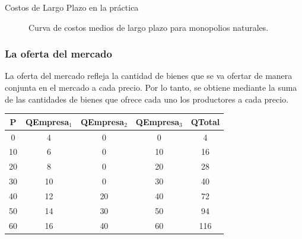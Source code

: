 \documentclass{beamer}
\begin{document}
\begin{frame}{Costos de Largo Plazo en la práctica}
    \begin{figure}[h!]
        \centering
        \caption{Curva de costos medios de largo plazo para monopolios naturales.}
        \end{figure}
\end{frame}

\begin{frame}
    \frametitle{La oferta del mercado}
    \begin{boxA}
        \centering
        La oferta del mercado refleja la cantidad de bienes que se va ofertar de manera conjunta en el mercado a cada precio. Por lo tanto, se obtiene mediante la suma de las cantidades de bienes que ofrece cada uno los productores a cada precio.
    \end{boxA}
    \renewcommand{\arraystretch}{1.2} %
    \begin{table}[h]
        \centering
        \setlength{\arrayrulewidth}{1pt} %
        \begin{tabular}{|c|c|c|c|c|}
            \hline
            \rowcolor{blue!20} %
            \textbf{P} & \textbf{QEmpresa$_1$} & \textbf{QEmpresa$_2$} & \textbf{QEmpresa$_3$} & \textbf{QTotal} \\
            \hline
            0  & 4  & 0  & 0  & 4  \\
            10 & 6  & 0  & 10 & 16 \\
            20 & 8  & 0  & 20 & 28 \\
            30 & 10 & 0  & 30 & 40 \\
            40 & 12 & 20 & 40 & 72 \\
            50 & 14 & 30 & 50 & 94 \\
            60 & 16 & 40 & 60 & 116 \\
            \hline
        \end{tabular}
    \end{table}
\end{frame}
\end{document}

